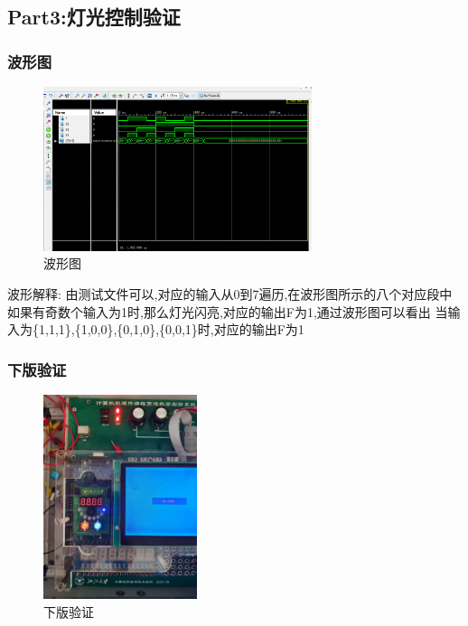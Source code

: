 \documentclass{article}
\begin{document}
\subsection{Part3:灯光控制验证}

\subsubsection{波形图}

	
	\begin{figure}[H]
	\centering
	\includegraphics[width=0.7\textwidth]{8.png}
	\caption{\label{Lab5}波形图}
	\end{figure}

波形解释:
	由测试文件可以,对应的输入从0到7遍历,在波形图所示的八个对应段中
	如果有奇数个输入为1时,那么灯光闪亮,对应的输出F为1,通过波形图可以看出
	当输入为\{1,1,1\},\{1,0,0\},\{0,1,0\},\{0,0,1\}时,对应的输出F为1


\subsubsection{下版验证}

	\begin{figure}[H]
	\centering
	\includegraphics[width=0.4\textwidth]{21.jpg}
	\caption{\label{Lab5}下版验证}
	\end{figure}
\end{document}
